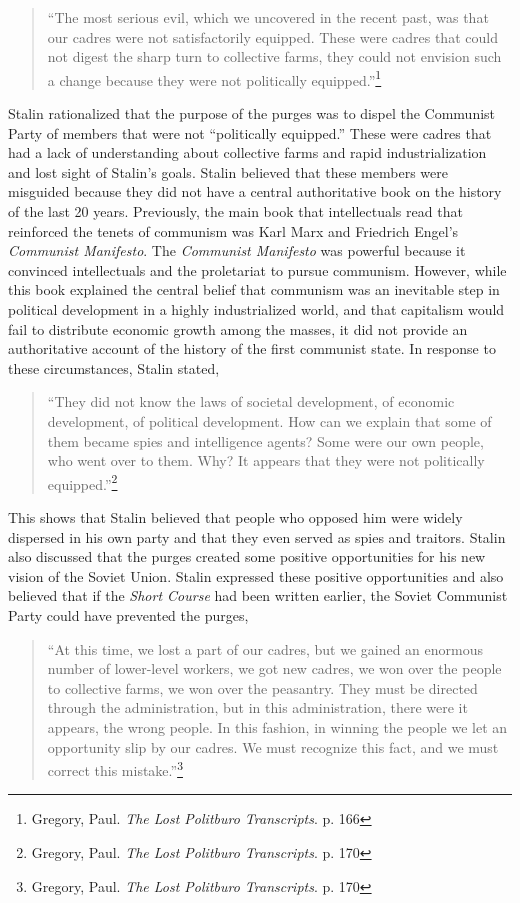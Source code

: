 \documentclass[a4paper, twocolumn]{article}
\begin{document}
\begin{quote}
``The most serious evil, which we uncovered in the recent past, was
that our cadres were not satisfactorily equipped. These were cadres
that could not digest the sharp turn to collective farms, they could
not envision such a change because they were not politically
equipped.''\footnote{Gregory, Paul. \emph{The Lost Politburo Transcripts}. p. 166}
\end{quote}

Stalin rationalized that the purpose of the purges was to dispel the
Communist Party of members that were not ``politically equipped.'' These
were cadres that had a lack of understanding about collective farms
and rapid industrialization and lost sight of Stalin's goals.  Stalin
believed that these members were misguided because they did not have a
central authoritative book on the history of the last 20
years. Previously, the  main book that intellectuals read that
reinforced the tenets of communism was Karl Marx and Friedrich Engel’s
\emph{Communist Manifesto}. The \emph{Communist Manifesto} was powerful because it
convinced intellectuals and the proletariat to pursue
communism. However, while this book explained the central belief that
communism was an inevitable step in political development in a highly
industrialized world, and that capitalism would fail to distribute
economic growth among the masses, it did not provide an authoritative
account of the history of the first communist state. In response to
these circumstances, Stalin stated,

\begin{quote}
``They did not know the laws of societal development, of economic
development, of political development. How can we explain that some of
them became spies and intelligence agents? Some were our own people,
who went over to them. Why? It appears that they were not politically
equipped.''\footnote{Gregory, Paul. \emph{The Lost Politburo Transcripts}. p. 170}
\end{quote}

This shows that Stalin believed that people who opposed him were
widely dispersed in his own party and that they even served as spies
and traitors. Stalin also discussed that the purges created some
positive opportunities for his new vision of the Soviet Union. Stalin
expressed these positive opportunities and also believed that
if the \emph{Short Course} had been written earlier, the Soviet
Communist Party could have prevented the purges,

 \begin{quote}
``At this time, we lost a part of our cadres, but we gained an enormous
number of lower-level workers, we got new cadres, we won over the
people to collective farms, we won over the peasantry. They must be
directed through the administration, but in this administration, there
were it appears, the wrong people. In this fashion, in winning the
people we let an opportunity slip by our cadres. We must recognize
this fact, and we must correct this mistake.''\footnote{Gregory, Paul. \emph{The Lost Politburo Transcripts}. p. 170}
\end{quote}
\end{document}
